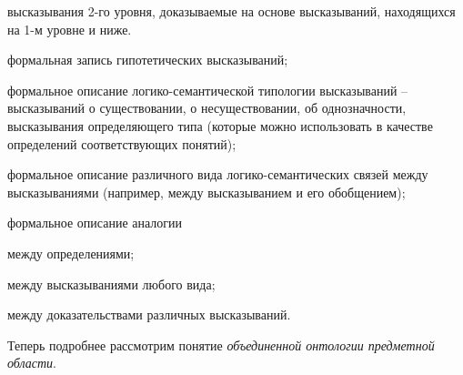 \begin{textitemize}
\begin{textitemize}
		\item высказывания 2-го уровня, доказываемые на основе высказываний, находящихся на 1-м уровне и ниже.
	\end{textitemize}
	\item формальная запись гипотетических высказываний;
	\item формальное описание логико-семантической типологии высказываний -- высказываний о существовании, о несуществовании, об однозначности, высказывания определяющего  типа (которые можно использовать в качестве определений соответствующих понятий);
	\item формальное описание различного вида логико-семантических связей между высказываниями (например, между высказыванием и его обобщением);
	\item формальное описание аналогии
	\begin{textitemize}
		\item между определениями;	
		\item между высказываниями любого вида;
		\item между доказательствами различных высказываний.
	\end{textitemize}
\end{textitemize}    

\begin{SCn}
\end{SCn}

Теперь подробнее рассмотрим понятие \textit{объединенной онтологии предметной области}.

